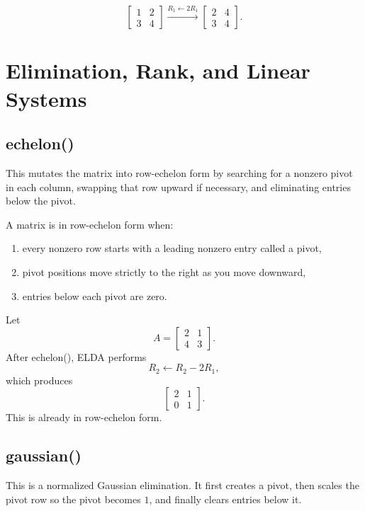 \documentclass[11pt,a4paper,openany]{book}
\def\code#1{#1}%
\DeclareRobustCommand{\code}[1]{\texttt{\detokenize{#1}}}
\begin{document}
\begin{examplebox}[Example]
\[
\begin{bmatrix}
1 & 2 \\
3 & 4
\end{bmatrix}
\xrightarrow{R_1 \leftarrow 2R_1}
\begin{bmatrix}
2 & 4 \\
3 & 4
\end{bmatrix}.
\]
\end{examplebox}

\chapter{Elimination, Rank, and Linear Systems}

\section{\code{echelon()}}
This mutates the matrix into row-echelon form by searching for a nonzero pivot in each column, swapping that row upward if necessary, and eliminating entries below the pivot.

\begin{mathbox}
A matrix is in row-echelon form when:
\begin{enumerate}[label=\arabic*.]
    \item every nonzero row starts with a leading nonzero entry called a pivot,
    \item pivot positions move strictly to the right as you move downward,
    \item entries below each pivot are zero.
\end{enumerate}
\end{mathbox}

\begin{examplebox}[Example]
Let
\[
A =
\begin{bmatrix}
2 & 1 \\
4 & 3
\end{bmatrix}.
\]
After \code{echelon()}, ELDA performs
\[
R_2 \leftarrow R_2 - 2R_1,
\]
which produces
\[
\begin{bmatrix}
2 & 1 \\
0 & 1
\end{bmatrix}.
\]
This is already in row-echelon form.
\end{examplebox}

\section{\code{gaussian()}}
This is a normalized Gaussian elimination. It first creates a pivot, then scales the pivot row so the pivot becomes \(1\), and finally clears entries below it.
\end{document}
